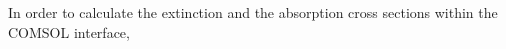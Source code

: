 
In order to calculate the extinction and the absorption cross sections within the COMSOL interface, 